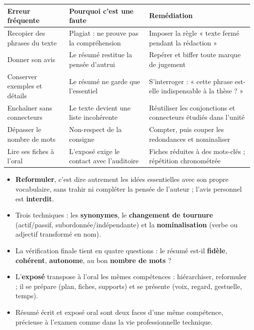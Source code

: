 \documentclass[11pt]{article}
\begin{document}
\begin{center}
\begin{tabularx}{\linewidth}{|l|X|X|}
\hline
\rowcolor{popblueL} \textbf{Erreur fréquente} & \textbf{Pourquoi c'est une faute} & \textbf{Remédiation} \\
\hline
Recopier des phrases du texte & Plagiat : ne prouve pas la compréhension & Imposer la règle « texte fermé pendant la rédaction » \\
\hline
Donner son avis & Le résumé restitue la pensée d'autrui & Repérer et biffer toute marque de jugement \\
\hline
Conserver exemples et détails & Le résumé ne garde que l'essentiel & S'interroger : « cette phrase est-elle indispensable à la thèse ? » \\
\hline
Enchaîner sans connecteurs & Le texte devient une liste incohérente & Réutiliser les conjonctions et connecteurs étudiés dans l'unité \\
\hline
Dépasser le nombre de mots & Non-respect de la consigne & Compter, puis couper les redondances et nominaliser \\
\hline
Lire ses fiches à l'oral & L'exposé exige le contact avec l'auditoire & Fiches réduites à des mots-clés ; répétition chronométrée \\
\hline
\end{tabularx}
\end{center}

\begin{aretenir}
\begin{itemize}
\item \textbf{Reformuler}, c'est dire autrement les idées essentielles avec son propre vocabulaire, sans trahir ni compléter la pensée de l'auteur ; l'avis personnel est \textbf{interdit}.
\item Trois techniques : les \textbf{synonymes}, le \textbf{changement de tournure} (actif/passif, subordonnée/indépendante) et la \textbf{nominalisation} (verbe ou adjectif transformé en nom).
\item La vérification finale tient en quatre questions : le résumé est-il \textbf{fidèle}, \textbf{cohérent}, \textbf{autonome}, au bon \textbf{nombre de mots} ?
\item L'\textbf{exposé} transpose à l'oral les mêmes compétences : hiérarchiser, reformuler ; il se prépare (plan, fiches, supports) et se présente (voix, regard, gestuelle, temps).
\item Résumé écrit et exposé oral sont deux faces d'une même compétence, précieuse à l'examen comme dans la vie professionnelle technique.
\end{itemize}
\end{aretenir}
\end{document}
